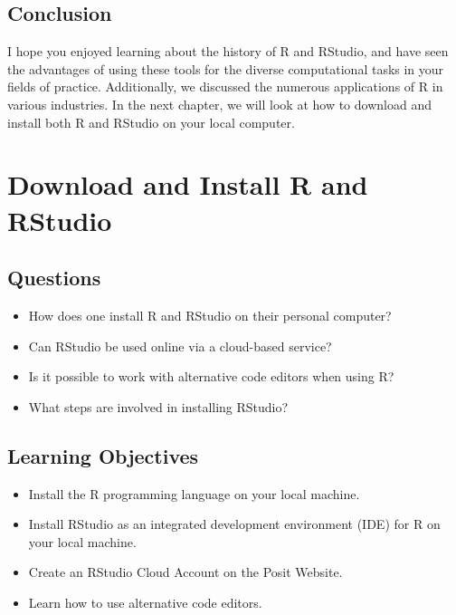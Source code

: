 \documentclass[
  letterpaper,
  DIV=11,
  numbers=noendperiod]{scrreprt}
\begin{document}
\section{Conclusion}\label{conclusion}

I hope you enjoyed learning about the history of R and RStudio, and have
seen the advantages of using these tools for the diverse computational
tasks in your fields of practice. Additionally, we discussed the
numerous applications of R in various industries. In the next chapter,
we will look at how to download and install both R and RStudio on your
local computer.


\chapter{Download and Install R and RStudio}\label{sec-download-install}

\section{Questions}\label{questions-1}

\begin{itemize}
\item
  How does one install R and RStudio on their personal computer?
\item
  Can RStudio be used online via a cloud-based service?
\item
  Is it possible to work with alternative code editors when using R?
\item
  What steps are involved in installing RStudio?
\end{itemize}

\section{Learning Objectives}\label{learning-objectives-1}

\begin{itemize}
\item
  Install the R programming language on your local machine.
\item
  Install RStudio as an integrated development environment (IDE) for R
  on your local machine.
\item
  Create an RStudio Cloud Account on the Posit Website.
\item
  Learn how to use alternative code editors.
\end{itemize}
\end{document}
